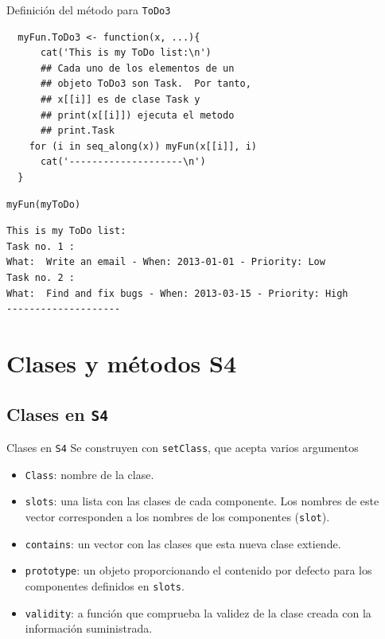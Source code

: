 \documentclass[xcolor={usenames,svgnames,dvipsnames}]{beamer}
\begin{document}
\begin{frame}[label={sec:orge4a58c0},fragile]{Definición del método para \texttt{ToDo3}}
 \lstset{language=r,label= ,caption= ,captionpos=b,numbers=none}
\begin{lstlisting}
  myFun.ToDo3 <- function(x, ...){
      cat('This is my ToDo list:\n')
      ## Cada uno de los elementos de un
      ## objeto ToDo3 son Task.  Por tanto,
      ## x[[i]] es de clase Task y
      ## print(x[[i]]) ejecuta el metodo
      ## print.Task
    for (i in seq_along(x)) myFun(x[[i]], i)
      cat('--------------------\n')
  }
\end{lstlisting}

\lstset{language=r,label= ,caption= ,captionpos=b,numbers=none}
\begin{lstlisting}
myFun(myToDo)
\end{lstlisting}

\begin{verbatim}
This is my ToDo list:
Task no. 1 :
What:  Write an email - When: 2013-01-01 - Priority: Low 
Task no. 2 :
What:  Find and fix bugs - When: 2013-03-15 - Priority: High 
--------------------
\end{verbatim}
\end{frame}


\section{Clases y métodos S4}
\label{sec:orgb39583d}

\subsection{Clases en \texttt{S4}}
\label{sec:orga00987b}
\begin{frame}[label={sec:org014bd51},fragile]{Clases en \texttt{S4}}
 Se construyen con \texttt{setClass}, que acepta varios argumentos
\begin{itemize}
\item \texttt{Class}: nombre de la clase.
\item \texttt{slots}: una lista con las clases de cada componente. Los nombres de este vector corresponden a los nombres de los componentes (\texttt{slot}).
\item \texttt{contains}: un vector con las clases que esta nueva clase extiende.
\item \texttt{prototype}: un objeto proporcionando el contenido por defecto para los componentes definidos en \texttt{slots}.
\item \texttt{validity}: a función que comprueba la validez de la clase creada con la información suministrada.
\end{itemize}
\end{frame}
\end{document}
